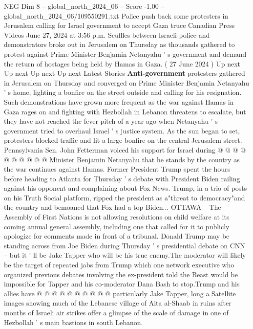 \begin{textsample}{NEG Dim 8 – global\_north\_2024\_06 – Score -1.00 – global\_north\_2024\_06/109550291.txt}  \label{ex:f8_neg_197}
Police push back some protesters in Jerusalem calling for Israel government to accept Gaza truce Canadian Press Videos June 27, 2024 at 3:56 p.m.
Scuffles between Israeli police and demonstrators broke out in Jerusalem on Thursday as thousands gathered to protest against Prime Minister Benjamin Netanyahu ' s government and demand the return of hostages being held by Hamas in Gaza. ( 27 June 2024 ) Up next Up next Up next Up next Latest Stories \textbf{Anti-government} protesters gathered in Jerusalem on Thursday and converged on Prime Minister Benjamin Netanyahu ' s home, lighting a bonfire on the street outside and calling for his resignation.
Such demonstrations have grown more frequent as the war against Hamas in Gaza rages on and fighting with Hezbollah in Lebanon threatens to escalate, but they have not reached the fever pitch of a year ago when Netanyahu ' s government tried to overhaul Israel ' s justice system.
As the sun began to set, protesters blocked traffic and lit a large bonfire on the central Jerusalem street.
Pennsylvania Sen.
John Fetterman voiced his support for Israel during @ @ @ @ @ @ @ @ @ @ Minister Benjamin Netanyahu that he stands by the country as the war continues against Hamas.
Former President Trump spent the hours before heading to Atlanta for Thursday ' s debate with President Biden railing against his opponent and complaining about Fox News.
Trump, in a trio of posts on his Truth Social platform, ripped the president as a"threat to democracy"and the country and bemoaned that Fox had a top Biden...
OTTAWA -- The Assembly of First Nations is not allowing resolutions on child welfare at its coming annual general assembly, including one that called for it to publicly apologize for comments made in front of a tribunal.
Donald Trump may be standing across from Joe Biden during Thursday ' s presidential debate on CNN -- but it ' ll be Jake Tapper who will be his true enemy.The moderator will likely be the target of repeated jabs from Trump which one network executive who organized previous debates involving the ex-president told the Beast would be impossible for Tapper and his co-moderator Dana Bash to stop.Trump and his allies have @ @ @ @ @ @ @ @ @ @ particularly Jake Tapper, long a Satellite images showing much of the Lebanese village of Aita al-Shaab in ruins after months of Israeli air strikes offer a glimpse of the scale of damage in one of Hezbollah ' s main bastions in south Lebanon.

\end{textsample}
